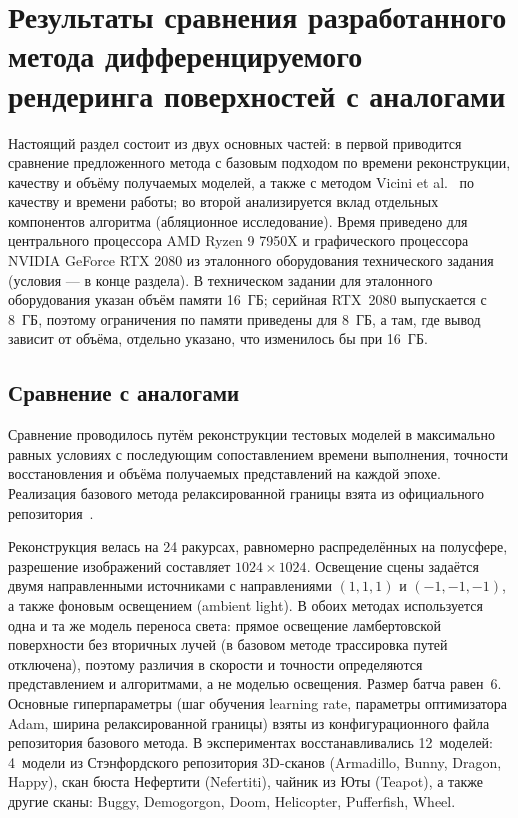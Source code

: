 \chapter{Результаты сравнения разработанного метода дифференцируемого рендеринга поверхностей с аналогами}
\label{ch:chap4}

Настоящий раздел состоит из двух основных частей: в первой приводится сравнение предложенного метода с базовым подходом по времени реконструкции, качеству и объёму получаемых моделей, а также с методом Vicini et al.~\cite{WASSDF2022} по качеству и времени работы; во второй анализируется вклад отдельных компонентов алгоритма (абляционное исследование). Время приведено для центрального процессора AMD Ryzen 9 7950X и графического процессора NVIDIA GeForce RTX 2080 из эталонного оборудования технического задания (условия --- в конце раздела). В техническом задании для эталонного оборудования указан объём памяти 16~ГБ; серийная RTX~2080 выпускается с 8~ГБ, поэтому ограничения по памяти приведены для 8~ГБ, а там, где вывод зависит от объёма, отдельно указано, что изменилось бы при 16~ГБ.

\section{Сравнение с аналогами}

Сравнение проводилось путём реконструкции тестовых моделей в максимально равных условиях с последующим сопоставлением времени выполнения, точности восстановления и объёма получаемых представлений на каждой эпохе. Реализация базового метода релаксированной границы взята из официального репозитория~\cite{DRSDF24Repo}.

Реконструкция велась на 24 ракурсах, равномерно распределённых на полусфере, разрешение изображений составляет $1024\times 1024$. Освещение сцены задаётся двумя направленными источниками с направлениями $(1, 1, 1)$ и $(-1, -1, -1)$, а также фоновым освещением (ambient light). В обоих методах используется одна и та же модель переноса света: прямое освещение ламбертовской поверхности без вторичных лучей (в базовом методе трассировка путей отключена), поэтому различия в скорости и точности определяются представлением и алгоритмами, а не моделью освещения. Размер батча равен~6. Основные гиперпараметры (шаг обучения learning rate, параметры оптимизатора Adam, ширина релаксированной границы) взяты из конфигурационного файла репозитория базового метода. В экспериментах восстанавливались 12~моделей: 4~модели из Стэнфордского репозитория 3D-сканов (Armadillo, Bunny, Dragon, Happy), скан бюста Нефертити (Nefertiti), чайник из Юты (Teapot), а также другие сканы: Buggy, Demogorgon, Doom, Helicopter, Pufferfish, Wheel.


